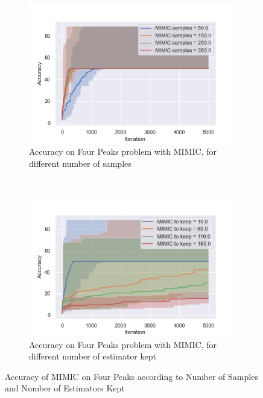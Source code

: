\documentclass[10pt]{article}
\begin{document}
				\begin{figure}[h]
					\centering
					\begin{subfigure}[t]{0.45\columnwidth}
						\centering
						\includegraphics[width=\linewidth]{../graphics/four_peaks_MIMIC_Iteration_Error_MIMIC_samples.png}
						\caption{Accuracy on Four Peaks problem with MIMIC, for different number of samples}
						\label{fp:mimic_samples}
					\end{subfigure}
					~
					\begin{subfigure}[t]{0.45\columnwidth}
						\centering
						\includegraphics[width=\linewidth]{../graphics/four_peaks_MIMIC_Iteration_Error_MIMIC_to_keep.png}
						\caption{Accuracy on Four Peaks problem with MIMIC, for different number of estimator kept}
						\label{fp:mimic_to_keep}
					\end{subfigure}
					\caption{Accuracy of MIMIC on Four Peaks according to Number of Samples and Number of Estimators Kept}
					\label{fp:mimic}
				\end{figure}
\end{document}
